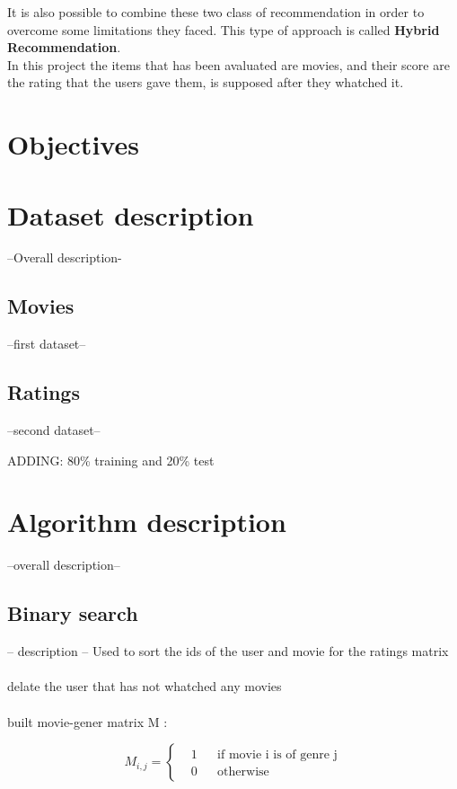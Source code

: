\documentclass{article}
\begin{document}
It is also possible to combine these two class of recommendation in order to overcome some limitations they faced. This type of approach is called \textbf{Hybrid Recommendation}.\\
In this project the items that has been avaluated are movies, and their score are the rating that the users gave them, is supposed after they whatched it.

\newpage

\section{Objectives}

\newpage

\section{Dataset description}
--Overall description-

\subsection{Movies}
--first dataset--

\subsection{Ratings}
--second dataset--

ADDING: 80\% training and 20\% test

\newpage

\section{Algorithm description}
--overall description--

\subsection{Binary search}
-- description --
Used to sort the ids of the user and movie for the ratings matrix\\ \\
delate the user that has not whatched any movies\\ \\
built movie-gener matrix M :

\begin{equation}
      M_{i,j} = \left \{
            \begin{aligned}
                  &1 && \text{if movie i is of genre j}\\
                  &0 && \text{otherwise}
            \end{aligned} \right.
\end{equation}
\end{document}
